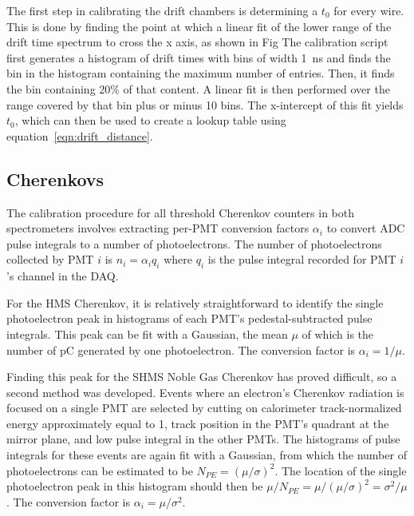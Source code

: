 The first step in calibrating the drift chambers is determining a $t_0$ for
every wire.
This is done by finding the point at which a linear fit of the lower range of
the drift time spectrum to cross the x axis, as shown in Fig %
The calibration script first generates a histogram of drift times with bins of
width \SI{1}{\nano\second}
and finds the bin in the histogram containing the maximum number of entries.
Then, it finds the bin containing 20\% of that content.
A linear fit is then performed over the range covered by that bin plus or minus
10 bins.
The x-intercept of this fit yields $t_0$, which can then be used to create a
lookup table using equation~\ref{eqn:drift_distance}.



\subsection{Cherenkovs}

The calibration procedure for all threshold Cherenkov counters in both
spectrometers involves extracting per-PMT conversion factors $\alpha_i$ to
convert ADC pulse integrals to a number of photoelectrons.
The number of photoelectrons collected by PMT $i$ is $n_i=\alpha_iq_i$ where
$q_i$ is the pulse integral recorded for PMT $i$'s channel in the DAQ.


For the HMS Cherenkov, it is relatively straightforward to identify the single
photoelectron peak in histograms of each PMT's pedestal-subtracted pulse
integrals.
This peak can be fit with a Gaussian, the mean $\mu$ of which is the number of
\si{\pico\coulomb} generated by one photoelectron.
The conversion factor is $\alpha_i=1/\mu$.


Finding this peak for the SHMS Noble Gas Cherenkov has proved difficult, so a
second method was developed.
Events where an electron's Cherenkov radiation is focused on a single PMT are
selected by cutting on
calorimeter track-normalized energy approximately equal to 1,
track position in the PMT's quadrant at the mirror plane,
and low pulse integral in the other PMTs.
The histograms of pulse integrals for these events are again fit with a
Gaussian, from which the number of photoelectrons can be estimated to be
$N_{PE}=(\mu/\sigma)^2$.
The location of the single photoelectron peak in this histogram should then
be $\mu/N_{PE}=\mu/(\mu/\sigma)^2=\sigma^2/\mu$.
The conversion factor is $\alpha_i=\mu/\sigma^2$.


